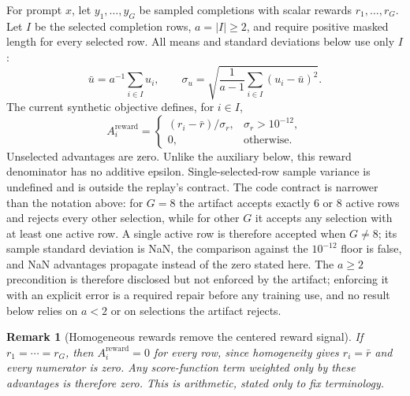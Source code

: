 \documentclass{article}
\newtheorem{remark}{Remark}
\begin{document}
For prompt $x$, let $y_1,\ldots,y_G$ be sampled completions with scalar rewards
$r_1,\ldots,r_G$. Let $I$ be the selected completion rows, $a=|I|\ge2$,
and require positive masked length for every selected row. All means and
standard deviations below use only $I$:
\[
 \bar u=a^{-1}\sum_{i\in I}u_i,\qquad
 \sigma_u=\sqrt{\frac{1}{a-1}\sum_{i\in I}(u_i-\bar u)^2}.
\]
The current synthetic objective defines, for $i\in I$,
\begin{equation}
  A_i^{\mathrm{reward}}
  = \begin{cases}(r_i-\bar r)/\sigma_r,&\sigma_r>10^{-12},\\
  0,&\text{otherwise}.\end{cases}
\end{equation}
Unselected advantages are zero. Unlike the auxiliary below, this reward
denominator has no additive epsilon. Single-selected-row sample variance is
undefined and is outside the replay's contract. The code contract is
narrower than the notation above: for $G=8$ the artifact accepts exactly
6 or 8 active rows and rejects every other selection, while for other $G$
it accepts any selection with at least one active row. A single active row
is therefore accepted when $G\ne8$; its sample standard deviation is NaN,
the comparison against the $10^{-12}$ floor is false, and NaN advantages
propagate instead of the zero stated here. The $a\ge2$
precondition is therefore disclosed but not enforced by the artifact;
enforcing it with an explicit error is a required repair before any
training use, and no result below relies on $a<2$ or on selections the
artifact rejects.

\begin{remark}[Homogeneous rewards remove the centered reward signal]
If $r_1=\cdots=r_G$, then $A_i^{\mathrm{reward}}=0$ for every row, since
homogeneity gives $r_i=\bar r$ and every numerator is zero. Any
score-function term weighted only by these advantages is therefore zero.
This is arithmetic, stated only to fix terminology.
\end{remark}
\end{document}
